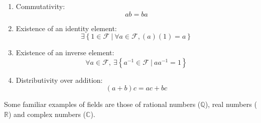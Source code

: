 \begin{enumerate}
\begin{enumerate}
	\item Commutativity:
		\begin{equation*}
		ab=ba
		\end{equation*}
	\item Existence of an identity element:
		\begin{equation*}
		\exists \left\{1 \in\mathcal{F} \medspace \vert \medspace \forall a\in\mathcal{F}, (a)(1)=a\right\}
		\end{equation*}
	\item Existence of an inverse element:
		\begin{equation*}
		\forall a \in\mathcal{F}, \medspace \exists \left\{a^{-1} \in \mathcal{F} \medspace \vert \medspace aa^{-1}=1 \right\}
		\end{equation*}
	\item Distributivity over addition:
		\begin{equation*}
		(a+b)c = ac+bc
		\end{equation*}
\end{enumerate}
\end{enumerate}

Some familiar examples of fields are those of rational numbers ($\mathbb{Q}$), real numbers ($\mathbb{R}$) and complex numbers ($\mathbb{C}$).


